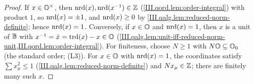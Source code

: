 \begin{theorem}
\end{theorem}
\begin{proof}
If $x\in\mathbb{O}^\times$, then $\operatorname{nrd}(x),\operatorname{nrd}(x^{-1})\in\mathbb{Z}$ (\cref{III.qord.lem:order-integral}) with product $1$, so $\operatorname{nrd}(x)=\pm1$, and $\operatorname{nrd}(x)\ge0$ by
\cref{III.qalg.lem:reduced-norm-definite}; hence $\operatorname{nrd}(x)=1$. Conversely, if $x\in\mathbb{O}$ and $\operatorname{nrd}(x)=1$, then $x$ is a unit of $\mathbb{B}$ with
$x^{-1}=\bar x=\operatorname{trd}(x)-x\in\mathbb{O}$ (\cref{III.qalg.lem:unit-iff-reduced-norm-unit,III.qord.lem:order-integral}). For finiteness, choose $N\ge1$ with
$N\mathbb{O}\subseteq\mathbb{O}_0$ (the standard order; (L3)). For $x\in\mathbb{O}$ with $\operatorname{nrd}(x)=1$, the coordinates satisfy $\sum x_\mu^2\le1$
(\cref{III.qalg.lem:reduced-norm-definite}) and $Nx_\mu\in\mathbb{Z}$; there are finitely many such $x$.
\end{proof}

